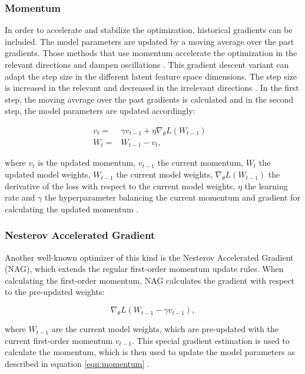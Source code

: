 \subsubsection{Momentum}
In order to accelerate and stabilize the optimization, historical gradients can be included. The model parameters are updated by a moving average over the past gradients. Those methods that use momentum accelerate the optimization in the relevant directions and dampen oscillations \cite{Ruder2016}. This gradient descent variant can adapt the step size in the different latent feature space dimensions. The step size is increased in the relevant and decreased in the irrelevant directions \cite{Ruder2016}. In the first step, the moving average over the past gradients is calculated and in the second step, the model parameters are updated accordingly:

    \begin{equation}
      \begin{aligned}
          v_{t} = & \gamma v_{t-1} +  \eta \nabla_{\theta}L(W_{t-1}) &\\
          W_{t} = &W_{t-1} - v_{t},
          \label{eqn:momentum}
      \end{aligned}
    \end{equation}

where $v_{t}$ is the updated momentum, $v_{t-1}$ the current momentum, $W_{t}$ the updated model weights, $W_{t-1}$ the current model weights, $\nabla_{\theta}L(W_{t-1})$ the derivative of the loss with respect to the current model weights, $\eta$ the learning rate and $\gamma$ the hyperparameter balancing the current momentum and gradient for calculating the updated momentum \cite{Ruder2016}.

    
\subsubsection{Nesterov Accelerated Gradient}
Another well-known optimizer of this kind is the Nesterov Accelerated Gradient (NAG), which extends the regular first-order momentum update rules. When calculating the first-order momentum, NAG calculates the gradient with respect to the pre-updated weights: 

\begin{equation}
    \nabla_{\theta}L( W_{t-1} - \gamma v_{t-1}),
\end{equation}
    
where $W_{t-1}$ are the current model weights, which are pre-updated with the current first-order momentum $v_{t-1}$. This special gradient estimation is used to calculate the momentum, which is then used to update the model parameters as described in equation \ref{eqn:momentum} \cite{Ruder2016}.

